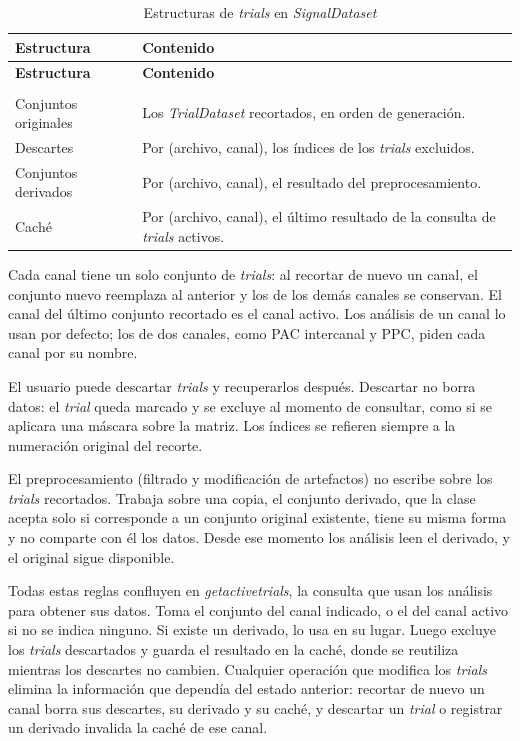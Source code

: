 \documentclass[12pt,letterpaper,oneside]{article}
\DeclareRobustCommand{\_}{\textunderscore\allowbreak}
\begin{document}
\begin{center}
\small
\begin{longtable}{|p{}|p{}|}
\hline
\textbf{Estructura} & \textbf{Contenido} \\
\hline
\endfirsthead
\hline
\textbf{Estructura} & \textbf{Contenido} \\
\hline
\endhead
\hline
\endfoot
\hline
\caption{Estructuras de \textit{trials} en \textit{SignalDataset}} \label{tab:sdd_signal_estructuras} \\
\endlastfoot
Conjuntos originales & Los \textit{TrialDataset} recortados, en orden de generación. \\
\hline
Descartes & Por (archivo, canal), los índices de los \textit{trials} excluidos. \\
\hline
Conjuntos derivados & Por (archivo, canal), el resultado del preprocesamiento. \\
\hline
Caché & Por (archivo, canal), el último resultado de la consulta de \textit{trials} activos. \\
\hline
\end{longtable}
\end{center}

Cada canal tiene un solo conjunto de \textit{trials}: al recortar de nuevo un canal, el conjunto nuevo reemplaza al anterior y los de los demás canales se conservan. El canal del último conjunto recortado es el canal activo. Los análisis de un canal lo usan por defecto; los de dos canales, como PAC intercanal y PPC, piden cada canal por su nombre.

El usuario puede descartar \textit{trials} y recuperarlos después. Descartar no borra datos: el \textit{trial} queda marcado y se excluye al momento de consultar, como si se aplicara una máscara sobre la matriz. Los índices se refieren siempre a la numeración original del recorte.

El preprocesamiento (filtrado y modificación de artefactos) no escribe sobre los \textit{trials} recortados. Trabaja sobre una copia, el conjunto derivado, que la clase acepta solo si corresponde a un conjunto original existente, tiene su misma forma y no comparte con él los datos. Desde ese momento los análisis leen el derivado, y el original sigue disponible.

Todas estas reglas confluyen en \textit{get\_active\_trials}, la consulta que usan los análisis para obtener sus datos. Toma el conjunto del canal indicado, o el del canal activo si no se indica ninguno. Si existe un derivado, lo usa en su lugar. Luego excluye los \textit{trials} descartados y guarda el resultado en la caché, donde se reutiliza mientras los descartes no cambien. Cualquier operación que modifica los \textit{trials} elimina la información que dependía del estado anterior: recortar de nuevo un canal borra sus descartes, su derivado y su caché, y descartar un \textit{trial} o registrar un derivado invalida la caché de ese canal.
\end{document}
